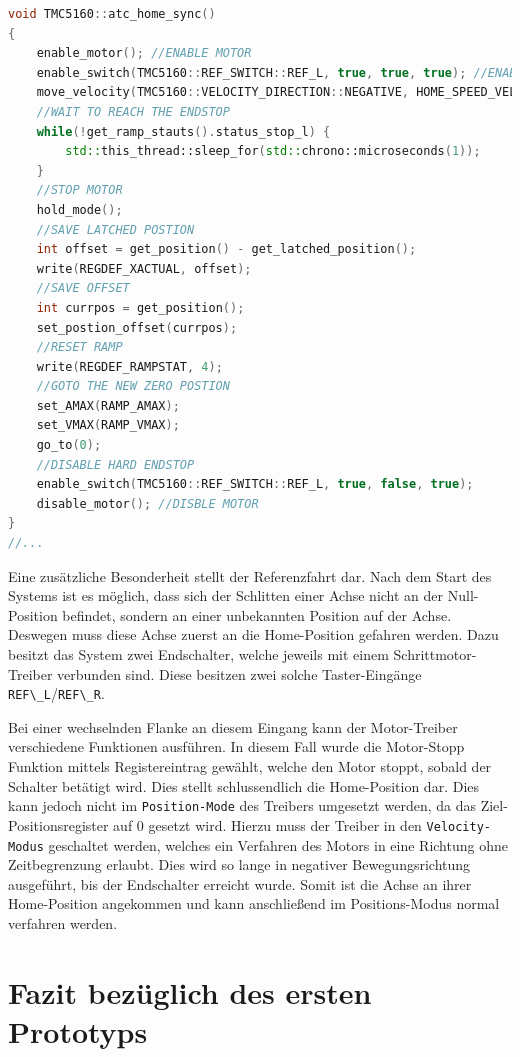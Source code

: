 \begin{lstlisting}[language={C++}]
void TMC5160::atc_home_sync()
{   
    enable_motor(); //ENABLE MOTOR
    enable_switch(TMC5160::REF_SWITCH::REF_L, true, true, true); //ENABLE LIMIT SWICHT => ENABLE HARD ENDSTOP
    move_velocity(TMC5160::VELOCITY_DIRECTION::NEGATIVE, HOME_SPEED_VELOCITY, 1000);  //MOVE NEGATIVE TO LIMIT SWITCH
    //WAIT TO REACH THE ENDSTOP
    while(!get_ramp_stauts().status_stop_l) {
        std::this_thread::sleep_for(std::chrono::microseconds(1));      
    }
    //STOP MOTOR
    hold_mode();
    //SAVE LATCHED POSTION
    int offset = get_position() - get_latched_position();
    write(REGDEF_XACTUAL, offset);
    //SAVE OFFSET
    int currpos = get_position();
    set_postion_offset(currpos);
    //RESET RAMP
    write(REGDEF_RAMPSTAT, 4);
    //GOTO THE NEW ZERO POSTION
    set_AMAX(RAMP_AMAX);
    set_VMAX(RAMP_VMAX);
    go_to(0);
    //DISABLE HARD ENDSTOP 
    enable_switch(TMC5160::REF_SWITCH::REF_L, true, false, true);
    disable_motor(); //DISBLE MOTOR
}
//...
\end{lstlisting}

Eine zusätzliche Besonderheit stellt der Referenzfahrt dar. Nach dem
Start des Systems ist es möglich, dass sich der Schlitten einer Achse
nicht an der Null-Position befindet, sondern an einer unbekannten
Position auf der Achse. Deswegen muss diese Achse zuerst an die
Home-Position gefahren werden. Dazu besitzt das System zwei Endschalter,
welche jeweils mit einem Schrittmotor-Treiber verbunden sind. Diese
besitzen zwei solche Taster-Eingänge
\passthrough{\lstinline!REF\_L!}/\passthrough{\lstinline!REF\_R!}.

Bei einer wechselnden Flanke an diesem Eingang kann der Motor-Treiber
verschiedene Funktionen ausführen. In diesem Fall wurde die Motor-Stopp
Funktion mittels Registereintrag gewählt, welche den Motor stoppt,
sobald der Schalter betätigt wird. Dies stellt schlussendlich die
Home-Position dar. Dies kann jedoch nicht im
\passthrough{\lstinline!Position-Mode!} des Treibers umgesetzt werden,
da das Ziel-Positionsregister auf 0 gesetzt wird. Hierzu muss der
Treiber in den \passthrough{\lstinline!Velocity-Modus!} geschaltet
werden, welches ein Verfahren des Motors in eine Richtung ohne
Zeitbegrenzung erlaubt. Dies wird so lange in negativer
Bewegungsrichtung ausgeführt, bis der Endschalter erreicht wurde. Somit
ist die Achse an ihrer Home-Position angekommen und kann anschließend im
Positions-Modus normal verfahren werden.

\hypertarget{fazit-bezuxfcglich-des-ersten-prototyps}{%
\section{Fazit bezüglich des ersten
Prototyps}\label{fazit-bezuxfcglich-des-ersten-prototyps}}

